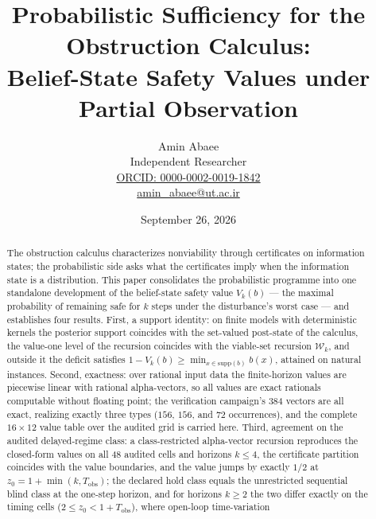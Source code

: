 \documentclass[10pt,twocolumn]{article}
\theoremstyle{plain}
\theoremstyle{definition}
\theoremstyle{remark}
\begin{document}
\title{Probabilistic Sufficiency for the Obstruction Calculus:\\
Belief-State Safety Values under Partial Observation}
\author{Amin Abaee\\[0.35em]
{\small Independent Researcher}\\[0.55em]
{\small\href{https://orcid.org/0000-0002-0019-1842}{ORCID: 0000-0002-0019-1842}}\\[0.3em]
{\small\href{mailto:amin\_abaee@ut.ac.ir}{amin\_abaee@ut.ac.ir}}}
\date{September 26, 2026}
\maketitle

\begin{abstract}
The obstruction calculus characterizes nonviability through certificates on
information states; the probabilistic side asks what the certificates imply
when the information state is a distribution. This paper consolidates the
probabilistic programme into one standalone development of the belief-state
safety value \(V_{k}(b)\) --- the maximal probability of remaining safe for
\(k\) steps under the disturbance's worst case --- and establishes four
results. First, a support identity: on finite models with deterministic
kernels the posterior support coincides with the set-valued post-state of
the calculus, the value-one level of the recursion coincides with the
viable-set recursion \(\mathcal{W}_{k}\), and outside it the deficit
satisfies \(1 - V_{k}(b) \ge \min_{x \in \mathrm{supp}(b)} b(x)\), attained
on natural instances. Second, exactness: over rational input data the
finite-horizon values are piecewise linear with rational alpha-vectors, so
all values are exact rationals computable without floating point; the
verification campaign's 384 vectors are all exact, realizing exactly three
types (\(156\), \(156\), and \(72\) occurrences), and the complete
\(16 \times 12\) value table over the audited grid is carried here. Third,
agreement on the audited delayed-regime class: a class-restricted
alpha-vector recursion reproduces the closed-form values on all 48 audited
cells and horizons \(k \le 4\), the certificate partition coincides with
the value boundaries, and the value jumps by exactly \(1/2\) at
\(z_{0} = 1 + \min(k, T_{\mathrm{obs}})\); the declared hold class equals
the unrestricted sequential blind class at the one-step horizon, and for
horizons \(k \ge 2\) the two differ exactly on the timing cells
(\(2 \le z_{0} < 1 + T_{\mathrm{obs}}\)), where open-loop time-variation

\end{abstract}
\end{document}
